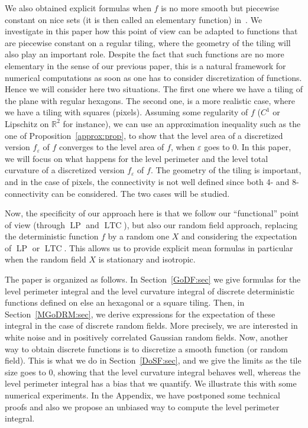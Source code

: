 \documentclass[10pt]{amsart}
\theoremstyle{definition}\newtheorem{defi}[theo]{Definition}\newtheorem{rema}[theo]{Remark}\newtheorem{exam}[theo]{Example}\newtheorem{exem}[theo]{Example}\newtheorem{nota}[theo]{Notation}
\newcommand{\R}{\mathbb{R}}
\newcommand{\eps}{\varepsilon}
\DeclareMathOperator{\LTC}{LTC}
\DeclareMathOperator{\LP}{LP}
\begin{document}
We also obtained explicit formulas when $f$ is no more smooth but piecewise constant on nice sets (it is then called an elementary function) in~\cite[Equation~(17) for $\LP$ and~(18) for $\LTC$]{BD-Geometry-published}. We investigate in this paper how this point of view can be adapted to functions that are piecewise constant on a regular tiling, where the geometry of the tiling will also play an important role. Despite the fact that such functions are no more elementary in the sense of our previous paper, this is a natural framework for numerical computations as soon as one has to consider discretization of functions. Hence we will consider here two situations. The first one where we have a tiling of the plane with regular hexagons. The second one, is a more realistic case, where we have a tiling with squares (pixels). Assuming some regularity of $f$ ($C^1$ or Lipschitz on $\R^2$ for instance), we can use an approximation inequality such as the one of Proposition~\ref{approx:prop}, to show that the level area of a discretized version $f_\eps$ of $f$ converges to the level area of $f$, when $\eps$ goes to $0$. In this paper, we will focus on what happens for the level perimeter and the level total curvature of a discretized version $f_\eps$ of $f$. The geometry of the tiling is important, and in the case of pixels, the connectivity is not well defined since both 4- and 8-connectivity can be considered. The two cases will be studied.


Now, the specificity of our approach here is that we follow our ``functional'' point of view (through $\LP$ and $\LTC$), but also our random field approach, replacing the deterministic function $f$ by a random one $X$ and considering the expectation of $\LP$ or $\LTC$. This allows us to provide explicit mean formulas in particular when the random field $X$ is stationary and isotropic.



The paper is organized as follows. In Section~\ref{GoDF:sec} we give formulas for the level perimeter integral and the level curvature integral of discrete deterministic functions defined on else an hexagonal or a square tiling. Then, in Section~\ref{MGoDRM:sec}, we derive expressions for the expectation of these integral in the case of discrete random fields. More precisely, we are interested in white noise and in positively correlated Gaussian random fields. Now, another way to obtain discrete functions is to discretize a smooth function (or random field). This is what we do in Section~\ref{DoSF:sec}, and we give the limits as the tile size goes to $0$, showing that the level curvature integral behaves well, whereas the level perimeter integral has a bias that we quantify. We illustrate this with some numerical experiments. In the Appendix, we have postponed some technical proofs and also we propose an unbiased way to compute the level perimeter integral.
\end{document}
